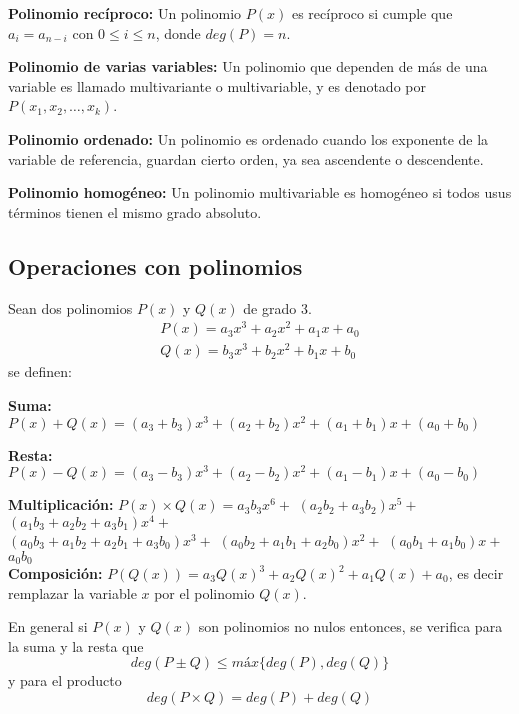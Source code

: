 \textbf{Polinomio recíproco:} Un polinomio $P(x)$ es recíproco si cumple que $a_i = a_{n-i}$ con $0\leq i\leq n$, donde $deg(P) = n$.

\textbf{Polinomio de varias variables:} Un polinomio que dependen de más de una variable es llamado multivariante o multivariable, y es denotado por $P(x_1, x_2, \dots, x_k)$.

\textbf{Polinomio ordenado:} Un polinomio es ordenado cuando los exponente de la variable de referencia, guardan cierto orden, ya sea ascendente o descendente.

\textbf{Polinomio homogéneo:} Un polinomio multivariable es homogéneo si todos usus términos tienen el mismo grado absoluto.


\subsection{Operaciones con polinomios}

Sean dos polinomios $P(x)$ y $Q(x)$ de grado 3.
\begin{gather*}
    P(x) = a_3x^3+a_2x^2+a_1x+a_0\\
    Q(x) = b_3x^3+b_2x^2+b_1x+b_0
\end{gather*}
se definen:

\textbf{Suma:} $P(x) + Q(x) = (a_3+b_3)x^3+(a_2+b_2)x^2+(a_1+b_1)x+(a_0+b_0)$

\textbf{Resta:} $P(x) - Q(x) = (a_3-b_3)x^3+(a_2-b_2)x^2+(a_1-b_1)x+(a_0-b_0)$

\textbf{Multiplicación:} $P(x)\times Q(x) = a_3b_3x^6 + $
$(a_2b_2+a_3b_2)x^5 + $
$(a_1b_3+a_2b_2+a_3b_1)x^4 + $\\
$(a_0b_3+a_1b_2+a_2b_1+a_3b_0)x^3 + $
$(a_0b_2+a_1b_1+a_2b_0)x^2 + $
$(a_0b_1+a_1b_0)x + $
$a_0b_0$\\

\textbf{Composición:} $P(Q(x)) = a_3Q(x)^3+a_2Q(x)^2+a_1Q(x)+a_0$, es decir remplazar la variable $x$ por el polinomio $Q(x)$.

En general si $P(x)$ y $Q(x)$ son polinomios no nulos entonces, se verifica para la suma y la resta que
\[deg(P\pm Q) \leq máx\{deg(P), deg(Q)\}\]
y para el producto \[deg(P\times Q) = deg(P) + deg(Q)\]